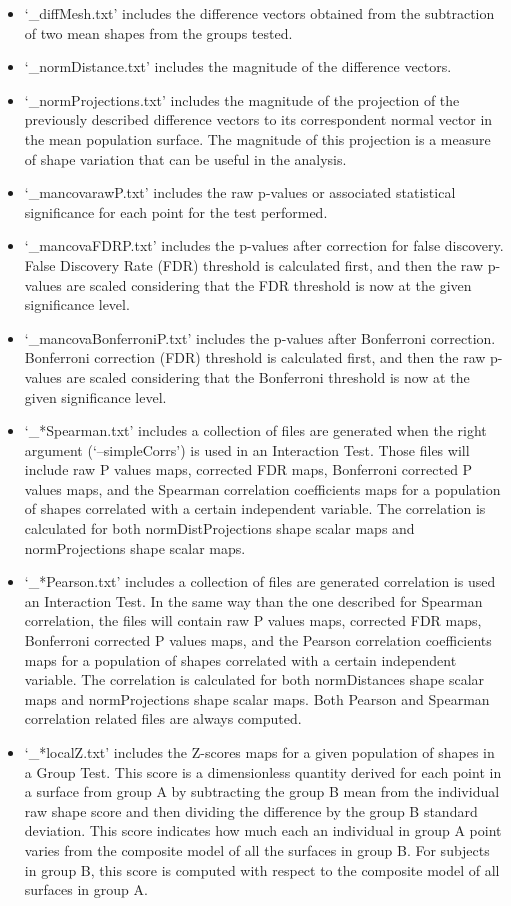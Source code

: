 \documentclass{InsightArticle}
\begin{document}
\begin{itemize}
	\item `\_diffMesh.txt' includes the difference vectors obtained from the subtraction of two mean shapes from the groups tested.
	\item `\_normDistance.txt' includes the magnitude of the difference vectors. 
	\item `\_normProjections.txt' includes the magnitude of the projection of the previously described difference vectors to its correspondent normal vector in the mean population surface. The magnitude of this projection is a measure of shape variation that can be useful in the analysis.
	\item `\_mancovarawP.txt' includes the raw p-values or associated statistical significance for each point for the test performed. 
	\item `\_mancovaFDRP.txt' includes the p-values after correction for false discovery. False Discovery Rate (FDR) \cite{Genovese02} threshold is calculated first, and then the raw p-values are scaled considering that the FDR threshold is now at the given significance level.
	\item `\_mancovaBonferroniP.txt' includes the p-values after Bonferroni correction. Bonferroni correction (FDR) threshold is calculated first, and then the raw p-values are scaled considering that the Bonferroni threshold is now at the given significance level.
	\item `\_*Spearman.txt' includes a collection of files are generated when the right argument (`--simpleCorrs') is used in an Interaction Test. Those files will include raw P values maps, corrected FDR maps, Bonferroni corrected P values maps, and the Spearman correlation coefficients maps for a population of shapes correlated with a certain independent variable. The correlation is calculated for both normDistProjections shape scalar maps and normProjections shape scalar maps.
	\item `\_*Pearson.txt' includes a collection of files are generated correlation is used an Interaction Test. In the same way than the one described for Spearman correlation, the files will contain raw P values maps, corrected FDR maps, Bonferroni corrected P values maps, and the Pearson correlation coefficients maps for a population of shapes correlated with a certain independent variable. The correlation is calculated for both normDistances shape scalar maps and normProjections shape scalar maps. Both Pearson and Spearman correlation related files are always computed.
	\item `\_*localZ.txt' includes the Z-scores maps for a given population of shapes in a Group Test. This score is a dimensionless quantity derived for each point in a surface from group A by subtracting the group B mean from the individual raw shape score and then dividing the difference by the group B standard deviation. This score indicates how much each an individual in group A point varies from the composite model of all the surfaces in group B. For subjects in group B, this score is computed with respect to the composite model of all surfaces in group A.
\end{itemize}
\end{document}
